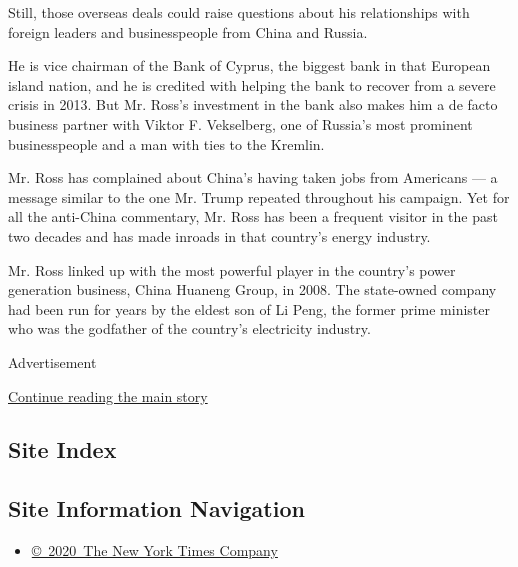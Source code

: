 Still, those overseas deals could raise questions about his
relationships with foreign leaders and businesspeople from China and
Russia.

He is vice chairman of the Bank of Cyprus, the biggest bank in that
European island nation, and he is credited with helping the bank to
recover from a severe crisis in 2013. But Mr. Ross's investment in the
bank also makes him a de facto business partner with Viktor F.
Vekselberg, one of Russia's most prominent businesspeople and a man with
ties to the Kremlin.

Mr. Ross has complained about China's having taken jobs from Americans
--- a message similar to the one Mr. Trump repeated throughout his
campaign. Yet for all the anti-China commentary, Mr. Ross has been a
frequent visitor in the past two decades and has made inroads in that
country's energy industry.

Mr. Ross linked up with the most powerful player in the country's power
generation business, China Huaneng Group, in 2008. The state-owned
company had been run for years by the eldest son of Li Peng, the former
prime minister who was the godfather of the country's electricity
industry.

Advertisement

\protect\hyperlink{after-bottom}{Continue reading the main story}

\hypertarget{site-index}{%
\subsection{Site Index}\label{site-index}}

\hypertarget{site-information-navigation}{%
\subsection{Site Information
Navigation}\label{site-information-navigation}}

\begin{itemize}
\tightlist
\item
  \href{https://help.nytimes.com/hc/en-us/articles/115014792127-Copyright-notice}{©~2020~The
  New York Times Company}
\end{itemize}

